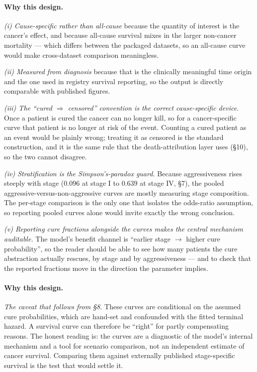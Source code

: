 \documentclass[12pt,a4paper]{article}
\newcommand{\why}[1]{\paragraph{Why this design.} #1}
\begin{document}
\why{\emph{(i) Cause-specific rather than all-cause} because the quantity of interest is the cancer's effect,
and because all-cause survival mixes in the larger non-cancer mortality --- which differs between the
packaged datasets, so an all-cause curve would make cross-dataset comparison meaningless.

\emph{(ii) Measured from diagnosis} because that is the clinically meaningful time origin and the one used
in registry survival reporting, so the output is directly comparable with published figures.

\emph{(iii) The ``cured $\Rightarrow$ censored'' convention is the correct cause-specific device.} Once a
patient is cured the cancer can no longer kill, so for a cancer-specific curve that patient is no longer at
risk of the event. Counting a cured patient as an event would be plainly wrong; treating it as censored is
the standard construction, and it is the same rule that the death-attribution layer uses (\S10), so the two
cannot disagree.

\emph{(iv) Stratification is the Simpson's-paradox guard.} Because aggressiveness rises steeply with stage
($0.096$ at stage I to $0.639$ at stage IV, \S7), the pooled aggressive-versus-non-aggressive curves are
mostly measuring stage composition. The per-stage comparison is the only one that isolates the odds-ratio
assumption, so reporting pooled curves alone would invite exactly the wrong conclusion.

\emph{(v) Reporting cure fractions alongside the curves makes the central mechanism auditable.} The model's
benefit channel is ``earlier stage $\rightarrow$ higher cure probability'', so the reader should be able to
see how many patients the cure abstraction actually rescues, by stage and by aggressiveness --- and to check
that the reported fractions move in the direction the parameter implies.}

\why{\emph{The caveat that follows from \S8.} These curves are conditional on the assumed cure
probabilities, which are hand-set and confounded with the fitted terminal hazard. A survival curve can
therefore be ``right'' for partly compensating reasons. The honest reading is: the curves are a diagnostic
of the model's internal mechanism and a tool for scenario comparison, not an independent estimate of cancer
survival. Comparing them against externally published stage-specific survival is the test that would settle
it.}
\end{document}
